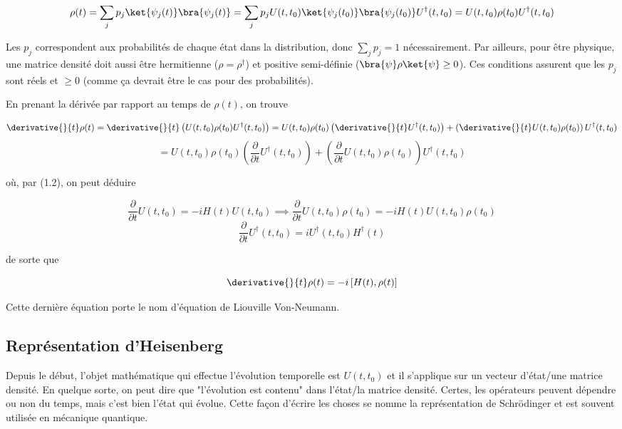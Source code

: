 \begin{equation}
    \rho(t) = \sum_{j}^{}p_j \ket{\psi_j(t)}\bra{\psi_j(t)} = \sum_{j}^{}p_j U(t,t_0)\ket{\psi_j(t_0)}\bra{\psi_j(t_0)}U^{\dagger}(t,t_0) = U(t,t_0)\rho(t_0)U^{\dagger}(t,t_0)
\end{equation}

Les $p_j$ correspondent aux probabilités de chaque état dans la distribution, donc $\sum_{j}^{}p_j = 1$ nécessairement. Par ailleurs, pour être physique, une matrice densité doit aussi être hermitienne ($\rho = \rho^{\dagger}$) et positive semi-définie ($\bra{\psi}\rho\ket{\psi} \geq 0$). Ces conditions assurent que les $p_j$ sont réels et $\geq 0$ (comme ça devrait être le cas pour des probabilités).

En prenant la dérivée par rapport au temps de $\rho(t)$, on trouve 

\begin{equation*}
    \derivative{}{t}\rho(t) = \derivative{}{t}\left(U(t,t_0)\rho(t_0)U^{\dagger}(t,t_0)\right) = U(t,t_0)\rho(t_0)\left(\derivative{}{t}U^{\dagger}(t,t_0)\right) + \left(\derivative{}{t}U(t,t_0)\rho(t_0)\right)U^{\dagger}(t,t_0)
\end{equation*}
\begin{equation*}
    = U(t,t_0)\rho(t_0)\left(\frac{\partial}{\partial t}U^{\dagger}(t,t_0)\right) + \left(\frac{\partial}{\partial t}U(t,t_0)\rho(t_0)\right)U^{\dagger}(t,t_0)
\end{equation*}

où, par (1.2), on peut déduire

\begin{equation*}
    \frac{\partial}{\partial t}U(t,t_0) = -iH(t)U(t,t_0) \implies \frac{\partial}{\partial t}U(t,t_0)\rho(t_0) = -iH(t)U(t,t_0)\rho(t_0)
\end{equation*}
\begin{equation*}
    \frac{\partial}{\partial t}U^{\dagger}(t,t_0) = iU^{\dagger}(t,t_0)H^\dagger(t) 
\end{equation*}

de sorte que

\begin{equation}
    \derivative{}{t}\rho(t) = -i\left[H(t), \rho(t)\right]
\end{equation}

Cette dernière équation porte le nom d'équation de Liouville Von-Neumann.

\subsection{Représentation d'Heisenberg}
Depuis le début, l'objet mathématique qui effectue l'évolution temporelle est $U(t,t_0)$ et il s'applique sur un vecteur d'état/une matrice densité. En quelque sorte, on peut dire que "l'évolution est contenu" dans l'état/la matrice densité. Certes, les opérateurs peuvent dépendre ou non du temps, mais c'est bien l'état qui évolue. Cette façon d'écrire les choses se nomme la représentation de Schrödinger et est souvent utilisée en mécanique quantique. 

